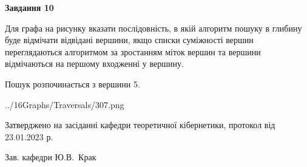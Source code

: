 \documentclass[12pt, ukrainian]{article}
\begin{document}
{\begin {large}
{\begin {center}\textbf{Завдання 10}\end {center}}\par
Для графа на рисунку вказати послідовність, в якій алгоритм пошуку в глибину буде відмічати відвідані вершини, якщо списки суміжності вершин переглядаються алгоритмом за зростанням міток вершин та вершини відмічаються на першому вход\-женні у вершину.\par
Пошук розпочинається з вершини 5.\par

\begin{center}
	{../16Graphs/Traversals/307.png}
\end{center}\par
\newpage


\end {large}
}
{\smallskip \begin {small} Затверджено на засіданні кафедри теоретичної кібернетики, протокол  від   23.01.2023 р.\par\smallskip\smallskip
{\parbox {6.5 cm}{Зав. кафедри \dotfill Ю.В.~Крак}} \end{small}}
\end{document}
